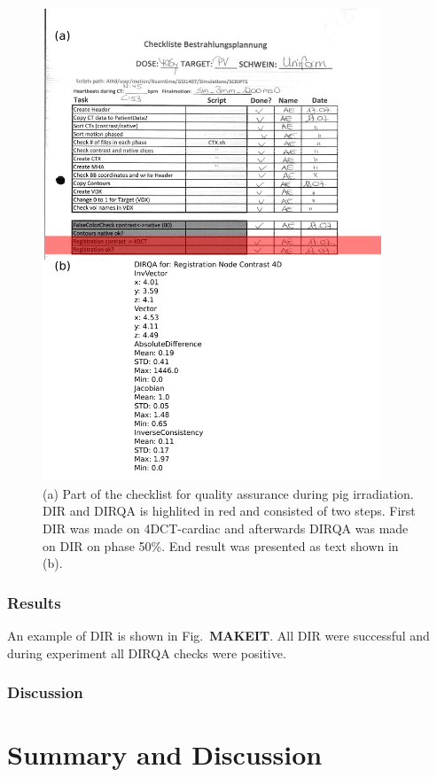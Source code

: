 \documentclass[type=dr, dr=rernat, accentcolor=tud7b,colorbacktitle, bigchapter, openright, twoside, 12pt ]{tudthesis}
\begin{document}
\newpage
\begin{figure}[H]
	\begin{center}		
		\includegraphics[width=0.9\textwidth]{./Images/checkList.png}
		\caption{(a) Part of the checklist for quality assurance during pig irradiation. DIR and DIRQA is highlited in red and consisted of two steps. First DIR was made on 4DCT-cardiac and afterwards DIRQA was made on
		DIR on phase 50\%. End result was presented as text shown in (b).}
		\label{checkList}
	\end{center}
\end{figure}
\newpage

\subsubsection{Results}


An example of DIR is shown in Fig.~\textbf{MAKEIT}. All DIR were successful and during experiment all DIRQA checks were positive.



\subsubsection{Discussion}



\section{Summary and Discussion}





{}
% 
\end{document}
